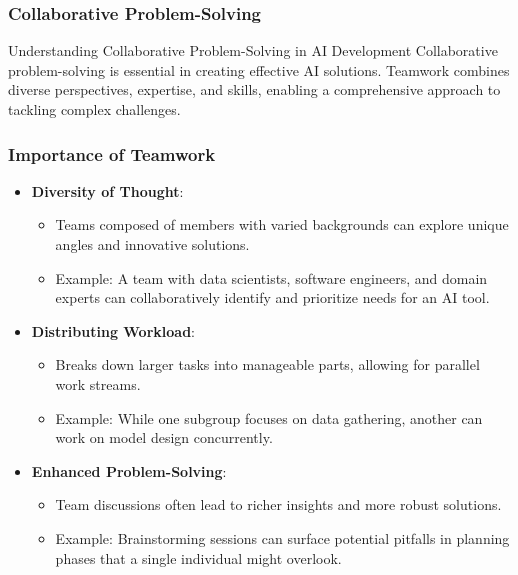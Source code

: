 \documentclass{beamer}
\begin{document}
\begin{frame}[fragile]
    \frametitle{Collaborative Problem-Solving}
    \begin{block}{Understanding Collaborative Problem-Solving in AI Development}
        Collaborative problem-solving is essential in creating effective AI solutions. 
        Teamwork combines diverse perspectives, expertise, and skills, enabling a comprehensive approach to tackling complex challenges.
    \end{block}
\end{frame}

\begin{frame}[fragile]
    \frametitle{Importance of Teamwork}
    \begin{itemize}
        \item \textbf{Diversity of Thought}:
        \begin{itemize}
            \item Teams composed of members with varied backgrounds can explore unique angles and innovative solutions.
            \item Example: A team with data scientists, software engineers, and domain experts can collaboratively identify and prioritize needs for an AI tool.
        \end{itemize}
        
        \item \textbf{Distributing Workload}:
        \begin{itemize}
            \item Breaks down larger tasks into manageable parts, allowing for parallel work streams.
            \item Example: While one subgroup focuses on data gathering, another can work on model design concurrently.
        \end{itemize}
        
        \item \textbf{Enhanced Problem-Solving}:
        \begin{itemize}
            \item Team discussions often lead to richer insights and more robust solutions.
            \item Example: Brainstorming sessions can surface potential pitfalls in planning phases that a single individual might overlook.
        \end{itemize}
    \end{itemize}
\end{frame}
\end{document}
